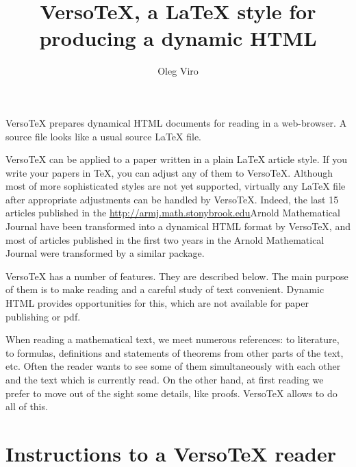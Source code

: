 \documentclass{article}
\begin{document}
\title{VersoTeX, a LaTeX style for producing a dynamic HTML}

\author{Oleg Viro}
\date{}

\maketitle

VersoTeX prepares dynamical HTML documents for reading in a web-browser. 
A source file looks like a usual source LaTeX file. 

VersoTeX can be applied to a paper written in a plain LaTeX article style. 
If you write your papers in TeX, you can adjust any of them to VersoTeX. 
Although most of more sophisticated styles are not yet supported, virtually 
any LaTeX file after appropriate adjustments can be handled by VersoTeX.
Indeed, the last 15 articles published in the
\url{http://armj.math.stonybrook.edu}{Arnold Mathematical Journal}
have been transformed into a dynamical HTML format by VersoTeX, and 
most of articles published in the first two years in the
Arnold Mathematical Journal were transformed by a similar package.

VersoTeX has a number of features. They are described below. 
The main purpose of them is to make reading and a careful study
of text convenient. Dynamic HTML provides opportunities for this, 
which are not available for paper publishing or pdf.

When reading a mathematical text, we meet 
numerous references: to literature, to formulas, definitions and statements
of theorems from other parts of the text, etc. Often the reader wants 
to see some of them simultaneously with each other and the text 
which is currently read. On the other hand, at first reading we prefer  
to move out of the sight some details, like proofs. VersoTeX allows to 
do all of this. 

\section{Instructions to a VersoTeX reader}\label{s1}
\end{document}
